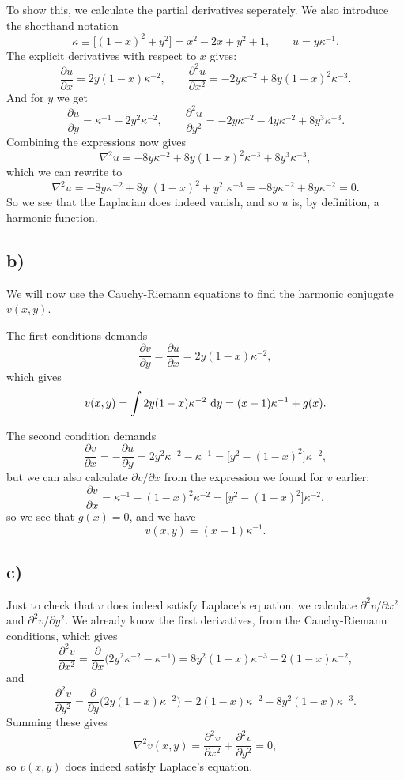 \documentclass[a4paper, 11pt, titlepage, english]{article}
\begin{document}
To show this, we calculate the partial derivatives seperately. We also introduce the shorthand notation
$$\kappa \equiv \big[(1-x)^2 + y^2\big] = x^2 - 2x + y^2 + 1, \qquad u = y\kappa^{-1}.$$
The explicit derivatives with respect to $x$ gives:
$$\frac{\partial u}{\partial x} = 2y(1-x)\kappa^{-2}, \qquad \frac{\partial^2 u}{\partial x^2} = -2y\kappa^{-2} + 8y(1-x)^2\kappa^{-3}.$$
And for $y$ we get
$$\frac{\partial u}{\partial y} = \kappa^{-1} - 2y^2\kappa^{-2}, \qquad \frac{\partial^2 u}{\partial y^2} = -2y\kappa^{-2}-4y\kappa^{-2} + 8y^3\kappa^{-3}.$$
Combining the expressions now gives
$$\nabla^2 u = -8y\kappa^{-2} + 8y(1-x)^2\kappa^{-3} + 8y^3\kappa^{-3},$$
which we can rewrite to
$$\nabla^2 u = -8y\kappa^{-2} + 8y\bigg[(1-x)^2 + y^2\bigg]\kappa^{-3} = -8y\kappa^{-2} + 8y\kappa^{-2} = 0.$$
So we see that the Laplacian does indeed vanish, and so $u$ is, by definition, a harmonic function.

\clearpage

\subsection*{b)}
We will now use the Cauchy-Riemann equations to find the harmonic conjugate $v(x,y)$. 

The first conditions demands
$$ \frac{\partial v}{\partial y} = \frac{\partial u}{\partial x} = 2y(1-x)\kappa^{-2},$$
which gives
$$v(x,y) = \int 2y(1-x)\kappa^{-2} {\rm\ d}y =  (x-1)\kappa^{-1} + g(x).$$

The second condition demands
$$\frac{\partial v}{\partial x} = - \frac{\partial u}{\partial y} = 2y^2\kappa^{-2} - \kappa^{-1} = \bigg[y^2 - (1-x)^2\bigg]\kappa^{-2},$$
but we can also calculate $\partial v/\partial x$ from the expression we found for $v$ earlier:
$$\frac{\partial v}{\partial x} = \kappa^{-1} - (1-x)^2\kappa^{-2} = \bigg[y^2 - (1-x)^2\bigg]\kappa^{-2},$$
so we see that $g(x) = 0$, and we have
$$v(x,y) = (x-1)\kappa^{-1}.$$



\subsection*{c)}
Just to check that $v$ does indeed satisfy Laplace's equation, we calculate $\partial^2 v/\partial x^2$ and $\partial^2 v/\partial y^2$. We already know the first derivatives, from the Cauchy-Riemann conditions, which gives
$$\frac{\partial^2 v}{\partial x^2} = \frac{\partial}{\partial x}\bigg(2y^2\kappa^{-2}-\kappa^{-1}\bigg) = 8y^2(1-x)\kappa^{-3} - 2(1-x)\kappa^{-2},$$
and
$$\frac{\partial^2 v}{\partial y^2} = \frac{\partial}{\partial y}\bigg(2y(1-x)\kappa^{-2}\bigg) = 2(1-x)\kappa^{-2} - 8y^2(1-x)\kappa^{-3}.$$
Summing these gives
$$\nabla^2 v(x,y) = \frac{\partial^2 v}{\partial x^2} + \frac{\partial^2 v}{\partial y^2} = 0,$$
so $v(x,y)$ does indeed satisfy Laplace's equation.
\end{document}
